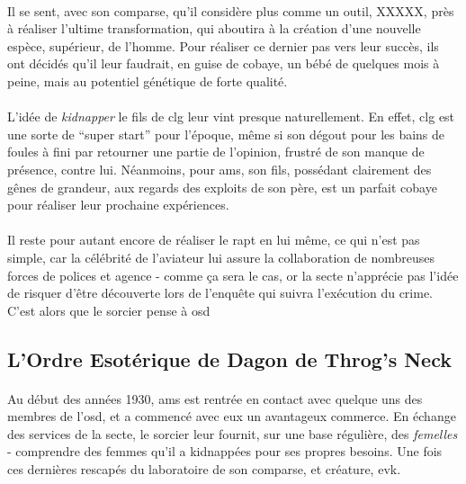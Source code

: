 \paragraph{} Il se sent, avec son comparse, qu'il considère plus comme un outil, XXXXX, près à réaliser l'ultime transformation, qui aboutira
à la création d'une nouvelle espèce, supérieur, de l'homme. Pour réaliser ce dernier pas vers leur succès, ils ont décidés qu'il leur faudrait,
en guise de cobaye, un bébé de quelques mois à peine, mais au potentiel génétique de forte qualité. 
\paragraph{} L'idée de \emph{kidnapper} le fils de \gls{clg} leur vint presque naturellement. En effet, \gls{clg} est une sorte de ``super start''
pour l'époque, même si son dégout pour les bains de foules à fini par retourner une partie de l'opinion, frustré de son manque de présence, contre
lui. Néanmoins, pour \gls{ams}, son fils, possédant clairement des gênes de grandeur, aux regards des exploits de son père, est un parfait cobaye
pour réaliser leur prochaine expériences.
\paragraph{} Il reste pour autant encore de réaliser le rapt en lui même, ce qui n'est pas simple, car la célébrité de l'aviateur lui assure la
collaboration de nombreuses forces de polices et agence - comme ça sera le cas, or la secte n'apprécie pas l'idée de risquer d'être découverte
lors de l'enquête qui suivra l'exécution du crime. C'est alors que le sorcier pense à \gls{osd}

\subsection{L'Ordre Esotérique de Dagon de Throg's Neck}

\paragraph{} Au début des années 1930, \gls{ams} est rentrée en contact avec quelque uns des membres
de l'\gls{osd}, et a commencé avec eux un avantageux commerce. En échange des services de la secte, 
le sorcier leur fournit, sur une base régulière, des \emph{femelles} - comprendre des femmes qu'il a 
kidnappées pour ses propres besoins. Une fois ces dernières rescapés du laboratoire de son comparse, et 
créature, \gls{evk}.

